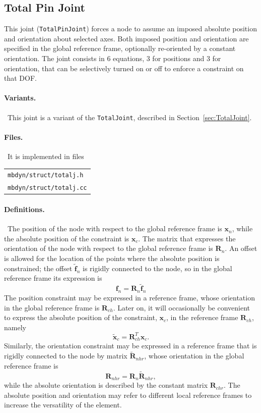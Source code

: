 \documentclass[10pt,fleqn,subeqn]{report}
\newcommand{\T}[1]{\bm{#1}}
\newcommand{\dof}{DOF}
\begin{document}
\subsection{Total Pin Joint}
\label{sec:TotalPinJoint}
This joint (\texttt{TotalPinJoint}) forces a node to assume an imposed absolute
position and orientation about selected axes.
Both imposed position and orientation are specified 
in the global reference frame, optionally re-oriented 
by a constant orientation.
The joint consists in 6 equations, 3 for positions and 3 for orientation, 
that can be selectively turned on or off to enforce a constraint on that \dof.

\paragraph{Variants.} \
This joint is a variant of the \texttt{TotalJoint},
described in Section~\ref{sec:TotalJoint}.

\paragraph{Files.} \
It is implemented in files\\
\begin{tabular}{l}
\texttt{mbdyn/struct/totalj.h} \\
\texttt{mbdyn/struct/totalj.cc}
\end{tabular}

\paragraph{Definitions.} \
The position of the node with respect to the global reference frame
is $\T{x}_n$, while the absolute position of the constraint is $\T{x}_c$.
The matrix that expresses the orientation of the node with respect
to the global reference frame is $\T{R}_n$.
An offset is allowed for the location of the points where 
the absolute position is constrained; the offset $\tilde{\T{f}}_n$
is rigidly connected to the node, so in the global reference frame 
its expression is
\begin{equation}
	\T{f}_n = \T{R}_n \tilde{\T{f}}_n
\end{equation}
The position constraint may be expressed in a reference frame,
whose orientation in the global reference frame is $\T{R}_{ch}$.
Later on, it will occasionally be convenient to express
the absolute position of the constraint, $\T{x}_c$, 
in the reference frame $\T{R}_{ch}$, namely
\begin{equation}
	\tilde{\T{x}}_{c} = \T{R}_{ch}^T \T{x}_c .
\end{equation}
Similarly, the orientation constraint may be expressed in a reference
frame that is rigidly connected to the node by matrix
$\tilde{\T{R}}_{nhr}$, whose orientation in the global reference frame is
\begin{equation}
	\T{R}_{nhr} = \T{R}_n \tilde{\T{R}}_{nhr} ,
\end{equation}
while the absolute orientation is described by the constant matrix
$\T{R}_{chr}$.
The absolute position and orientation may refer to different
local reference frames to increase the versatility of the element.
\end{document}
